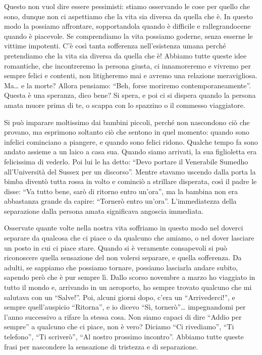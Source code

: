 Questo non vuol dire essere pessimisti: stiamo osservando le cose per
quello che sono, dunque non ci aspettiamo che la vita sia diversa da
quella che è. In questo modo la possiamo affrontare, sopportandola
quando è difficile e rallegrandocene quando è piacevole. Se comprendiamo
la vita possiamo goderne, senza esserne le vittime impotenti. C'è così
tanta sofferenza nell'esistenza umana perché pretendiamo che la vita sia
diversa da quella che è! Abbiamo tutte queste idee romantiche, che
incontreremo la persona giusta, ci innamoreremo e vivremo per sempre
felici e contenti, non litigheremo mai e avremo una relazione
meravigliosa. Ma\ldots{} e la morte? Allora pensiamo: ``Beh, forse
moriremo contemporaneamente''. Questa è una speranza, dico bene? Si
spera, e poi ci si dispera quando la persona amata muore prima di te, o
scappa con lo spazzino o il commesso viaggiatore.

Si può imparare moltissimo dai bambini piccoli, perché non nascondono
ciò che provano, ma esprimono soltanto ciò che sentono in quel momento:
quando sono infelici cominciano a piangere, e quando sono felici ridono.
Qualche tempo fa sono andato assieme a un laico a casa sua. Quando siamo
arrivati, la sua figlioletta era felicissima di vederlo. Poi lui le ha
detto: ``Devo portare il Venerabile Sumedho all'Università del Sussex
per un discorso''. Mentre stavamo uscendo dalla porta la bimba diventò
tutta rossa in volto e cominciò a strillare disperata, così il padre le
disse: ``Va tutto bene, sarò di ritorno entro un'ora'', ma la bambina
non era abbastanza grande da capire: ``Tornerò entro un'ora''.
L'immediatezza della separazione dalla persona amata significava
angoscia immediata.

Osservate quante volte nella nostra vita soffriamo in questo modo nel
doverci separare da qualcosa che ci piace o da qualcuno che amiamo, o
nel dover lasciare un posto in cui ci piace stare. Quando si è veramente
consapevoli si può riconoscere quella sensazione del non volersi
separare, e quella sofferenza. Da adulti, se sappiamo che possiamo
tornare, possiamo lasciarla andare subito, sapendo però che è pur sempre
lì. Dallo scorso novembre a marzo ho viaggiato in tutto il mondo e,
arrivando in un aeroporto, ho sempre trovato qualcuno che mi salutava
con un ``Salve!''. Poi, alcuni giorni dopo, c'era un ``Arrivederci!'', e
sempre quell'auspicio ``Ritorna'', e io dicevo ``Sì, tornerò''\ldots{}
impegnandomi per l'anno successivo a rifare la stessa cosa. Non siamo
capaci di dire ``Addio per sempre'' a qualcuno che ci piace, non è vero?
Diciamo ``Ci rivediamo'', ``Ti telefono'', ``Ti scriverò'', ``Al nostro
prossimo incontro''. Abbiamo tutte queste frasi per nascondere la
sensazione di tristezza e di separazione.

